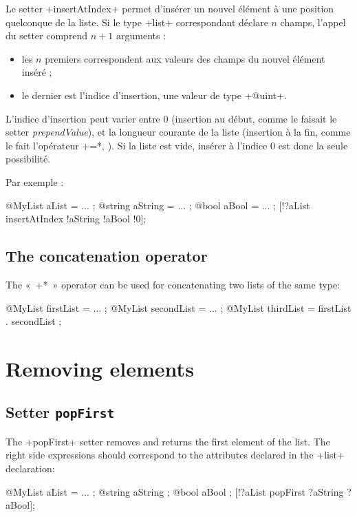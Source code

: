 Le setter \ggs+insertAtIndex+ permet d'insérer un nouvel élément à une position quelconque de la liste. Si le type \ggs+list+ correspondant déclare $n$ champs, l'appel du setter comprend $n+1$ arguments :
\begin{itemize}
  \item les $n$ premiers correspondent aux valeurs des champs du nouvel élément inséré ;
  \item le dernier est l'indice d'insertion, une valeur de type \ggs+@uint+.
\end{itemize}

L'indice d'insertion peut varier entre $0$ (insertion au début, comme le faisait le setter \emph{prependValue}), et la longueur courante de la liste (insertion à la fin, comme le fait l'opérateur \ggs*+=*, ). Si la liste est vide, insérer à l'indice $0$ est donc la seule possibilité.

Par exemple :

\begin{galgas}
@MyList aList = ... ;
@string aString = ... ;
@bool aBool = ... ;
[!?aList insertAtIndex !aString !aBool !0];
\end{galgas}

\subsection{The concatenation operator}

The «~\ggs*+*~» operator can be used for concatenating two lists of the same type:


\begin{galgas}
@MyList firstList = ... ;
@MyList secondList = ... ;
@MyList thirdList = firstList . secondList ;
\end{galgas}

\section{Removing elements}

\subsection{Setter \texttt{popFirst}}


The \ggs+popFirst+ setter removes and returns the first element of the list. The right side expressions should correspond to the attributes declared in the \ggs+list+ declaration:

\begin{galgas}
@MyList aList = ... ;
@string aString ;
@bool aBool ;
[!?aList popFirst ?aString ?aBool];
\end{galgas}


